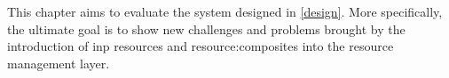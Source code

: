 This chapter aims to evaluate the system designed in \autoref{design}.
More specifically, the ultimate goal is to show new challenges and problems brought by the introduction of \gls{inp} resources and \glspl{resource:composite} into the resource management layer.